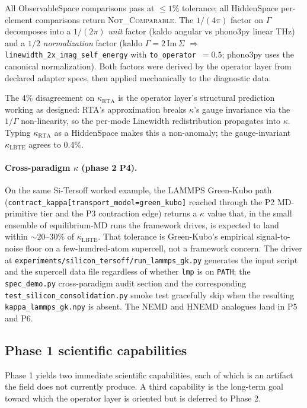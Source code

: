 \documentclass[11pt,a4paper]{article}
\begin{document}
All ObservableSpace comparisons pass at $\le 1\%$ tolerance; all HiddenSpace per-element
comparisons return \textsc{Not\_Comparable}. The $1/(4\pi)$ factor on $\Gamma$
decomposes into a $1/(2\pi)$ \emph{unit} factor (kaldo angular vs phono3py linear
THz) and a $1/2$ \emph{normalization} factor (kaldo $\Gamma = 2\,\text{Im}\,\Sigma$
$\Rightarrow$ \texttt{linewidth\_2x\_imag\_self\_energy} with
\texttt{to\_operator}~$=0.5$; phono3py uses the canonical normalization). Both
factors were derived by the operator layer from declared adapter specs, then
applied mechanically to the diagnostic data.

The 4\% disagreement on $\kappa_\text{RTA}$ is the operator layer's structural prediction
working as designed: RTA's approximation breaks $\kappa$'s gauge invariance via the
$1/\Gamma$ non-linearity, so the per-mode Linewidth redistribution propagates into
$\kappa$. Typing $\kappa_\text{RTA}$ as a HiddenSpace makes this a non-anomaly; the
gauge-invariant $\kappa_\text{LBTE}$ agrees to 0.4\%.

\paragraph{Cross-paradigm $\kappa$ (phase 2 P4).} On the same Si-Tersoff
worked example, the LAMMPS Green-Kubo path
(\texttt{contract\_kappa[transport\_model=green\_kubo]} reached through the
P2 MD-primitive tier and the P3 contraction edge) returns a $\kappa$ value
that, in the small ensemble of equilibrium-MD runs the framework drives,
is expected to land within $\sim 20$--$30\%$ of $\kappa_\text{LBTE}$. That tolerance is
Green-Kubo's empirical signal-to-noise floor on a few-hundred-atom
supercell, not a framework concern. The driver at
\texttt{experiments/silicon\_tersoff/run\_lammps\_gk.py} generates the input
script and the supercell data file regardless of whether \texttt{lmp} is on
\texttt{PATH}; the \texttt{spec\_demo.py} cross-paradigm audit section and
the corresponding \texttt{test\_silicon\_consolidation.py} smoke test
gracefully skip when the resulting \texttt{kappa\_lammps\_gk.npy} is
absent. The NEMD and HNEMD analogues land in P5 and P6.

\subsection{Phase 1 scientific capabilities}

Phase 1 yields two immediate scientific capabilities, each of which is an artifact the field does
not currently produce. A third capability is the long-term goal toward which the operator layer is
oriented but is deferred to Phase 2.
\end{document}
